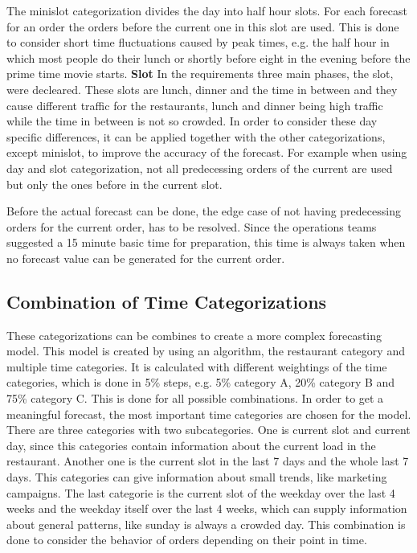 The minislot categorization divides the day into half hour slots. For each forecast for an order the orders before the current one in this slot are used. This is done to consider short time fluctuations caused by peak times, e.g. the half hour in which most people do their lunch or shortly before eight in the evening before the prime time movie starts.
\newline\textbf{Slot}\newline
In the requirements three main phases, the slot, were decleared. These slots are lunch, dinner and the time in between and they cause different traffic for the restaurants, lunch and dinner being high traffic while the time in between is not so crowded. In order to consider these day specific differences, it can be applied together with the other categorizations, except minislot, to improve the accuracy of the forecast. For example when using day and slot categorization, not all predecessing orders of the current are used but only the ones before in the current slot.

\newline
Before the actual forecast can be done, the edge case of not having predecessing orders for the current order, has to be resolved. Since the operations teams suggested a 15 minute basic time for preparation, this time is always taken when no forecast value can be generated for the current order.
\subsection{Combination of Time Categorizations}\label{subsection:Categorizing by Order}
These categorizations can be combines to create a more complex forecasting model. This model is created by using an algorithm, the restaurant category and multiple time categories. It is calculated with different weightings of the time categories, which is done in 5\% steps, e.g. 5\% category A, 20\% category B and 75\% category C. This is done for all possible combinations. In order to get a meaningful forecast, the most important time categories are chosen for the model. There are three categories with two subcategories. One is current slot and current day, since this categories contain information about the current load in the restaurant. Another one is the current slot in the last 7 days and the whole last 7 days. This categories can give information about small trends, like marketing campaigns. The last categorie is the current slot of the weekday over the last 4 weeks and the weekday itself over the last 4 weeks, which can supply information about general patterns, like sunday is always a crowded day.\newline
This combination is done to consider the behavior of orders depending on their point in time.
